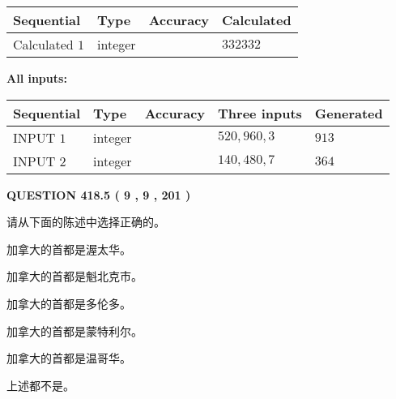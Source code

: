 \documentclass{ctexart}
\begin{document}
   
   
   
\noindent{}
   
   
  
  
\noindent\begin{tabular}{|l|l|l|l|}
\hline
 Sequential & Type & Accuracy & Calculated \\ 
\hline
 
 
  Calculated $  1 $ & integer &  & 
  $ 332332 $ 
 \\  \hline  
 \end{tabular}
   
   
   
   
\noindent\vspace{0.1in}\hspace{-0.08in} {\textbf{\Large{All inputs: }}}
   
   
  
  
\noindent\begin{tabular}{|l|l|l|l|l|}
\hline
 Sequential & Type & Accuracy & Three inputs & Generated \\ 
\hline
 
 
  INPUT $  1 $ & integer &  & $
 520
 , 
 960
 , 
 3
 $ & $ 913 $ 
 \\  \hline  
 
 
  INPUT $  2 $ & integer &  & $
 140
 , 
 480
 , 
 7
 $ & $ 364 $ 
 \\  \hline  
 \end{tabular}
   
   
  
\vspace{0.2in}
  
{\textbf{\Large{QUESTION
418.5 
 ( 9 , 9 , 201 )
}}}
  
  
请从下面的陈述中选择正确的。
 
 
加拿大的首都是渥太华。
 
 
加拿大的首都是魁北克市。
 
 
加拿大的首都是多伦多。
 
 
加拿大的首都是蒙特利尔。
 
 
加拿大的首都是温哥华。
 
 
 上述都不是。
 
 
\noindent{}
 
\end{document}
